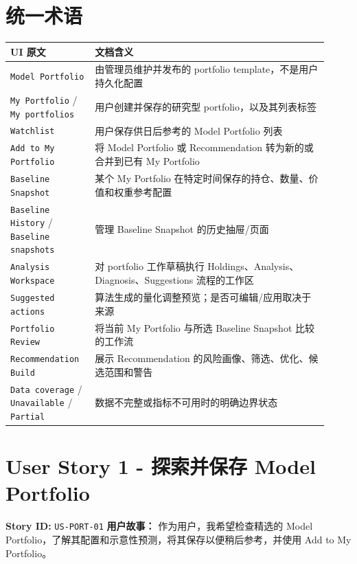 \section{统一术语}
\begingroup
\small
\begin{longtable}{L{0.24\linewidth}L{0.68\linewidth}}
\toprule
\textbf{UI 原文} & \textbf{文档含义} \\
\midrule
\texttt{Model Portfolio} & 由管理员维护并发布的 portfolio template，不是用户持久化配置 \\
\texttt{My Portfolio} /\allowbreak{} \texttt{My portfolios} & 用户创建并保存的研究型 portfolio，以及其列表标签 \\
\texttt{Watchlist} & 用户保存供日后参考的 Model Portfolio 列表 \\
\texttt{Add to My Portfolio} & 将 Model Portfolio 或 Recommendation 转为新的或合并到已有 My Portfolio \\
\texttt{Baseline Snapshot} & 某个 My Portfolio 在特定时间保存的持仓、数量、价值和权重参考配置 \\
\texttt{Baseline History} /\allowbreak{} \texttt{Baseline snapshots} & 管理 Baseline Snapshot 的历史抽屉/\allowbreak{}页面 \\
\texttt{Analysis Workspace} & 对 portfolio 工作草稿执行 Holdings、Analysis、Diagnosis、Suggestions 流程的工作区 \\
\texttt{Suggested actions} & 算法生成的量化调整预览；是否可编辑/\allowbreak{}应用取决于来源 \\
\texttt{Portfolio Review} & 将当前 My Portfolio 与所选 Baseline Snapshot 比较的工作流 \\
\texttt{Recommendation Build} & 展示 Recommendation 的风险画像、筛选、优化、候选范围和警告 \\
\texttt{Data coverage} /\allowbreak{} \texttt{Unavailable} /\allowbreak{} \texttt{Partial} & 数据不完整或指标不可用时的明确边界状态 \\
\bottomrule
\end{longtable}
\endgroup
\prdhr
\hypertarget{us-port-01}{}
\section{User Story 1 - 探索并保存 Model Portfolio}
\textbf{Story ID:} \texttt{US-PORT-01}
\textbf{用户故事：} 作为用户，我希望检查精选的 Model Portfolio，了解其配置和示意性预测，将其保存以便稍后参考，并使用 Add to My Portfolio。
